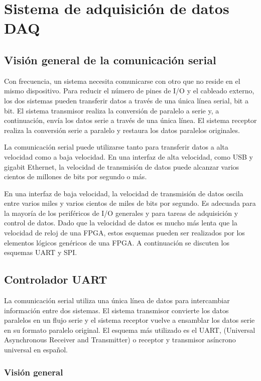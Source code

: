 \chapter{Sistema de adquisición de datos DAQ}

  \section{Visión general de la comunicación serial}

    Con frecuencia, un sistema necesita comunicarse con otro que no reside en el mismo dispositivo. Para reducir el número de pines de I/O y el cableado externo, los dos sistemas pueden transferir datos a través de una única línea serial, bit a bit. El sistema transmisor realiza la conversión de paralelo a serie y, a continuación, envía los datos serie a través de una única línea. El sistema receptor realiza la conversión serie a paralelo y restaura los datos paralelos originales.

    La comunicación serial puede utilizarse tanto para transferir datos a alta velocidad como a baja velocidad. En una interfaz de alta velocidad, como USB y gigabit Ethernet, la velocidad de transmisión de datos puede alcanzar varios cientos de millones de bits por segundo o más. 

    En una interfaz de baja velocidad, la velocidad de transmisión de datos oscila entre varios miles y varios cientos de miles de bits por segundo. Es adecuada para la mayoría de los periféricos de I/O generales y para tareas de adquisición y control de datos. Dado que la velocidad de datos es mucho más lenta que la velocidad de reloj de una FPGA, estos esquemas pueden ser realizados por los elementos lógicos genéricos de una FPGA. A continuación se discuten los esquemas UART y SPI.

	\section{Controlador UART}

    La comunicación serial utiliza una única línea de datos para intercambiar información entre dos sistemas. El sistema transmisor convierte los datos paralelos en un flujo serie y el sistema receptor vuelve a ensamblar los datos serie en su formato paralelo original. El esquema más utilizado es el UART, (Universal Asynchronous Receiver and Transmitter) o receptor y transmisor asíncrono universal en español.

    \subsection{Visión general}

